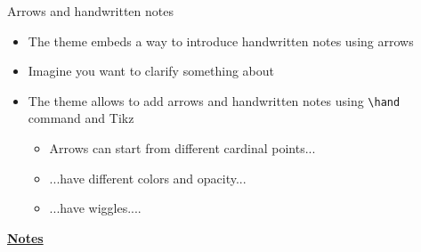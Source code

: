 \documentclass[10pt]{beamer}
\begin{document}
\begin{frame}[t]
    {Arrows and handwritten notes}\bigskip
    \begin{itemize}
        \item The theme embeds a way to introduce handwritten notes using arrows \bigskip\medskip
        \item Imagine you want to clarify something about  \bigskip\medskip
       \item The theme allows to add arrows and handwritten notes using \texttt{\textbackslash hand} command and Tikz \medskip
        \begin{itemize}
            \item Arrows can start from different cardinal points... \medskip
            \item ...have different colors and opacity... \medskip
            \item ...have wiggles....
        \end{itemize}
    \end{itemize}
\end{frame}
\begin{flushleft}
    \underline{\textbf{Notes}}\setlength{\parskip}{.15cm}\notesize\newline\par
\end{flushleft}
\end{document}
